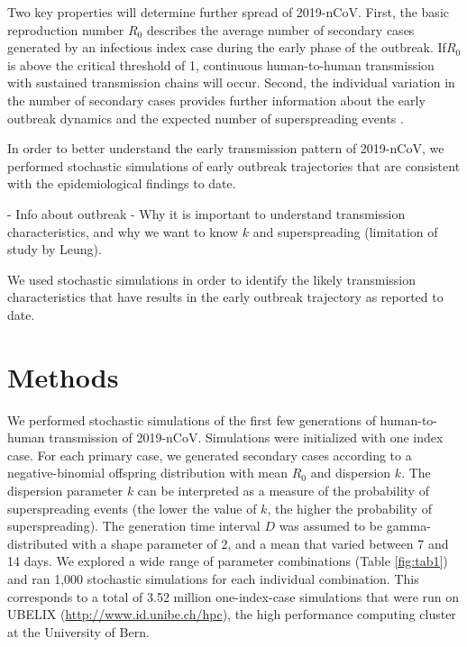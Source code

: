 \documentclass{article}
\begin{document}
Two key properties will determine further spread of 2019-nCoV. First, the basic reproduction number $R_0$ describes the average number of secondary cases generated by an infectious index case during the early phase of the outbreak. If$R_0$ is above the critical threshold of 1, continuous human-to-human transmission with sustained transmission chains will occur. Second, the individual variation in the number of secondary cases provides further information about the early outbreak dynamics and the expected number of superspreading events \cite{Lloyd-Smith:2005,Althaus:2015b,Kucharski:2015b}.

In order to better understand the early transmission pattern of 2019-nCoV, we performed stochastic simulations of early outbreak trajectories that are consistent with the epidemiological findings to date.


\cite{Shi:2020}

- Info about outbreak
- Why it is important to understand transmission characteristics, and why we want to know $k$ and superspreading (limitation of study by Leung).

We used stochastic simulations in order to identify the likely transmission characteristics that have results in the early outbreak trajectory as reported to date.

\section*{Methods}
We performed stochastic simulations of the first few generations of human-to-human transmission of 2019-nCoV. 
Simulations were initialized with one index case.
For each primary case, we generated secondary cases according to a negative-binomial offspring distribution with mean $R_0$ and dispersion $k$.\cite{Lloyd-Smith:2005,Althaus:2015b}
The dispersion parameter $k$ can be interpreted as a measure of the probability of superspreading events (the lower the value of $k$, the higher the probability of superspreading).
The generation time interval $D$ was assumed to be gamma-distributed with a shape parameter of 2, and a mean that varied between 7 and 14 days.
We explored a wide range of parameter combinations (Table \ref{fig:tab1}) and ran 1,000 stochastic simulations for each individual combination. 
This corresponds to a total of 3.52 million one-index-case simulations that were run on UBELIX (\url{http://www.id.unibe.ch/hpc}), the high performance computing cluster at the University of Bern. 
\end{document}
